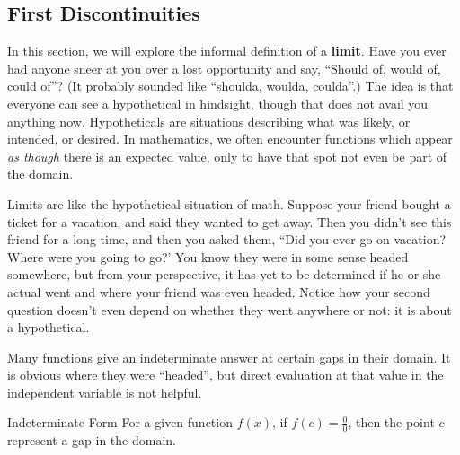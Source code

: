 
\subsection{First Discontinuities}


In this section, we will explore the informal definition of a \textbf{limit}.  Have you ever had anyone
sneer at you over a lost opportunity and say, ``Should of, would of, could of''?  (It probably
sounded like ``shoulda, woulda, coulda''.)  The idea is that everyone can see a hypothetical 
in hindsight, though that does not avail you anything now.  Hypotheticals are situations describing
what was likely, or intended, or desired.  In mathematics, we often encounter functions
which appear \textit{as though} there is an expected value, only to have that spot not
even be part of the domain.



Limits are like the hypothetical situation of math.  Suppose your friend bought a ticket for a vacation,
and said they wanted to get away.  Then you didn't see this friend for a long time, and then you asked
them, ``Did you ever go on vacation?  Where were you going to go?'  You know they 
were in some sense headed somewhere, but from your perspective, it has yet to be determined if
he or she actual went and where your friend was even headed.  Notice how your second question
doesn't even depend on whether they went anywhere or not: it is about a hypothetical.  

Many functions give an indeterminate answer at certain gaps in their domain.  It is obvious
where they were ``headed'', but direct evaluation at that value in the independent variable is
not helpful.



\begin{derivation}{Indeterminate Form}
For a given function $f(x)$, if $f(c)=\frac{0}{0}$, then the point $c$ represent a gap in the domain.
\end{derivation}


